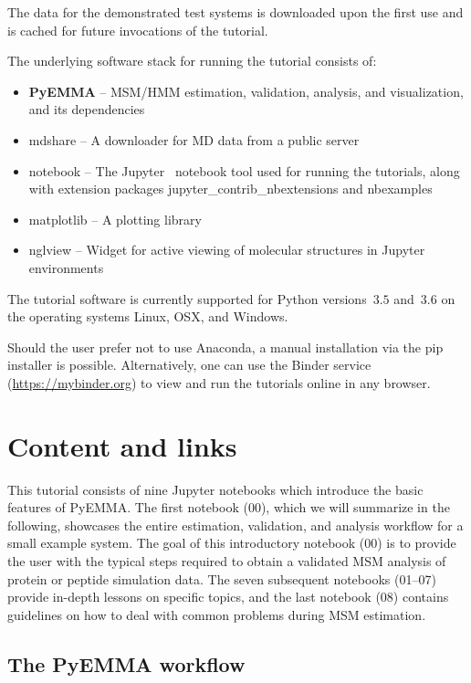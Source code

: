 \documentclass[9pt,tutorial]{livecoms}
\begin{document}
The data for the demonstrated test systems is downloaded upon the first use and is cached for future invocations of the tutorial.

The underlying software stack for running the tutorial consists of:
\begin{itemize}
\item \textbf{PyEMMA} -- MSM/HMM estimation, validation, analysis, and visualization, and its dependencies~\cite{pyemma}
\item mdshare -- A downloader for MD data from a public server
\item notebook -- The Jupyter~\cite{jupyter} notebook tool used for running the tutorials, along with extension packages jupyter\-\_contrib\_nbextensions and nbexamples
\item matplotlib -- A plotting library~\cite{matplotlib}
\item nglview -- Widget for active viewing of molecular structures in Jupyter environments~\cite{nglview}
\end{itemize}

The tutorial software is currently supported for Python versions~$3.5$ and~$3.6$ on the operating systems Linux, OSX, and Windows.

Should the user prefer not to use Anaconda, a manual installation via the pip installer is possible.
Alternatively, one can use the Binder service (\url{https://mybinder.org}) to view and run the tutorials online in any browser.

\section{Content and links}

This tutorial consists of nine Jupyter notebooks which introduce the basic features of PyEMMA.
The first notebook (00), which we will summarize in the following, showcases the entire estimation, validation, and analysis workflow for a small example system.
The goal of this introductory notebook (00) is to provide the user with the typical steps required to obtain a validated MSM analysis of protein or peptide simulation data.
The seven subsequent notebooks (01--07) provide in-depth lessons on specific topics, and the last notebook (08) contains guidelines on how to deal with common problems during MSM estimation.

\subsection{The PyEMMA workflow}
\end{document}
